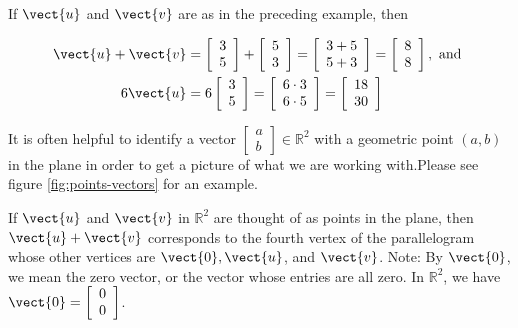 \begin{example}
    If $\vect{u}$ and $\vect{v}$ are as in the preceding example, then 

$$
\begin{aligned}
\vect{u} + \vect{v} & =\left[\begin{array}{l}
3 \\
5
\end{array}\right] + \left[\begin{array}{l}
5 \\
3
\end{array}\right] = \left[\begin{array}{l}
3+5 \\
5+3
\end{array}\right] = \left[\begin{array}{l}
8 \\
8
\end{array}\right], \text { and } \\
6 \vect{u} & = 6\left[\begin{array}{l}
3 \\
5
\end{array}\right] = \left[\begin{array}{l}
6 \cdot 3 \\
6 \cdot 5
\end{array}\right] = \left[\begin{array}{l}
18 \\
30
\end{array}\right]
\end{aligned}
$$

\end{example}

\begin{remark}
    It is often helpful to identify a vector $\left[\begin{array}{l}a \\ b\end{array}\right] \in \mathbb{R}^2$ with a geometric point $(a, b)$ in the plane in order to get a picture of what we are working with.Please see figure \ref{fig:points-vectors} for an example.
\end{remark}

If $\vect{u}$ and $\vect{v}$ in $\mathbb{R}^2$ are thought of as points in the plane, then $\vect{u} + \vect{v}$ corresponds to the fourth vertex of the parallelogram whose other vertices are $\vect{0}, \vect{u}$, and $\vect{v}$.
Note: By $\vect{0}$, we mean the zero vector, or the vector whose entries are all zero. In $\mathbb{R}^2$, we have $\vect{0} = \left[\begin{array}{l}
0 \\
0
\end{array}\right]$.


